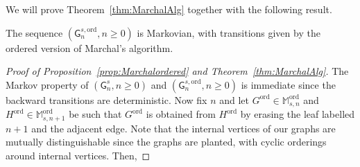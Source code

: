 \documentclass[10pt]{amsart}
\theoremstyle{definition}\newtheorem{defi}[theo]{Definition}\newtheorem{rema}[theo]{Remark}\newtheorem{exam}[theo]{Example}\newtheorem{exem}[theo]{Example}\newtheorem{nota}[theo]{Notation}
\newcommand{\ord}{\mathrm{ord}}
\newcommand{\sG}{\mathsf{G}}
\newcommand{\M}{\mathbb{M}}
\begin{document}
We will prove Theorem~\ref{thm:MarchalAlg} together with the following result.

\begin{prop}\label{prop:Marchalordered}
The sequence $(\sG^{s,\ord}_{n}, n\geq 0)$ is Markovian, with transitions given by the ordered version of Marchal's algorithm.
\end{prop}

\begin{proof}[Proof of Proposition~\ref{prop:Marchalordered} and Theorem~\ref{thm:MarchalAlg}]
The Markov property of $(\sG^s_n,n \geq 0)$ and $(\sG^{s,\ord}_{n},n \geq 0)$ is immediate since the backward transitions are deterministic. Now fix $n$ and let $G^{\ord} \in \M^{\ord}_{s,n}$ and $H^{\ord} \in \M^{\ord}_{s,n+1}$ be such that $G^{\ord}$ is obtained from $H^{\ord}$ by erasing the leaf labelled $n+1$ and the adjacent edge. Note that the internal vertices of our graphs are mutually distinguishable since the graphs are planted, with cyclic orderings around internal vertices. Then,


\end{proof}
\end{document}
